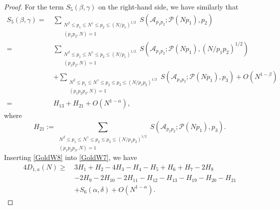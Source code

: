\documentclass[10pt,a4paper]{amsart}
\def\ge{\geqslant}
\def\le{\leqslant}
\def\leq{\leqslant}
\begin{document}
\begin{proof}
For the term $S_5(\beta,\gamma)$ on the right-hand side, 
we have similarly that 
		\begin{equation}\label{GoldW8}
		\begin{split}
		S_5(\beta,\gamma)=\ &\sum_{\substack{N^\beta \le p_1 \le N^\gamma \le p_2 \le (N/p_1)^{1/2} \\ (p_1 p_2, N) = 1}}  S(\mathscr{A}_{p_1 p_2}; \mathscr{P}(N p_1), p_2)\\
		=\ & \sum_{\substack{N^{\beta} \leq p_1 \le N^{\gamma} \leq p_2 \le (N/p_1)^{1/2} \\ (p_1 p_2, N) = 1}} S(\mathscr{A}_{p_1 p_2}; \mathscr{P}(N p_1), (N/p_1 p_2)^{1/2})\\
		&+\sum_{\substack{N^{\beta} \leq p_1 \le N^{\gamma} \leq p_2 \le p_3\le (N/p_1p_2)^{1/2} \\ (p_1 p_2 p_3, N) = 1}} S(\mathscr{A}_{p_1 p_2}; \mathscr{P}(N p_1), p_3)+O(N^{1-\beta})\\
		=\ &H_{13}+H_{21}+O(N^{1-\alpha}),
		\end{split}
		\end{equation}
		where 
		\begin{equation}
		H_{21}:=\sum_{\substack{N^{\beta} \leq p_1 \le N^{\gamma} \leq p_2 \le p_3\le (N/p_1p_2)^{1/2} \\ (p_1 p_2 p_3, N) = 1}} S(\mathscr{A}_{p_1 p_2}; \mathscr{P}(N p_1), p_3). 
		\end{equation}
Inserting \eqref{GoldW8} into \eqref{GoldW7}, we have
\begin{equation}\label{GoldW9}
\begin{split}
4D_{1,a}(N)
\ge\ & 3H_1+H_2-4H_3-H_4-H_5+H_6+H_7-2H_8\\
&-2H_9-2H_{10}-2H_{11}-H_{12}-H_{13}-H_{19}-H_{20}-H_{21} \\ 
& +S_6(\alpha,\delta)+O(N^{1-\alpha}).
\end{split}
\end{equation}
		

\end{proof}
\end{document}
